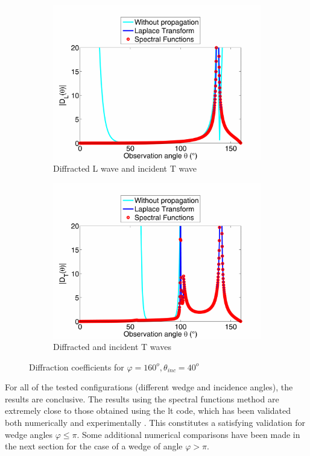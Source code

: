 \begin{figure}
\begin{subfigure}[b]{0.49\textwidth}
        \includegraphics[width=\textwidth]{images/chapter3/Figure9c.pdf}
        \caption{Diffracted L wave and incident T wave}
        \label{16040TL}
    \end{subfigure}
    \begin{subfigure}[b]{0.49\textwidth}
        \includegraphics[width=\textwidth]{images/chapter3/Figure9d.pdf}
        \caption{Diffracted and incident T waves}
        \label{16040TT}
     \end{subfigure}
     \caption{Diffraction coefficients for $\varphi=160^o, \theta_{inc}=40^o$}
     \label{16040}
\end{figure}

For all of the tested configurations (different wedge and incidence angles), the results are conclusive. The results using the spectral functions method are extremely close to those obtained using the \acrshort{lt} code, which has been validated both numerically and experimentally \cite{GautesenFradkin, ChapmanBurch}. This constitutes a satisfying validation for wedge angles $\varphi \leq \pi$. Some additional numerical comparisons have been made in the next section for the case of a wedge of angle $\varphi>\pi$.

